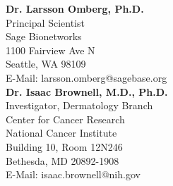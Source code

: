 \documentclass[margin,line]{res}
\begin{document}
\begin{resume}
\textbf{Dr. Larsson Omberg, Ph.D.}\\
Principal Scientist\\
Sage Bionetworks\\
1100 Fairview Ave N\\
Seattle, WA 98109\\
E-Mail: larsson.omberg@sagebase.org\\

\textbf{Dr. Isaac Brownell, M.D., Ph.D.}\\
Investigator, Dermatology Branch\\
Center for Cancer Research\\
National Cancer Institute\\
Building 10, Room 12N246\\
Bethesda, MD 20892-1908\\
E-Mail: isaac.brownell@nih.gov\\


\end{resume}
\end{document}
